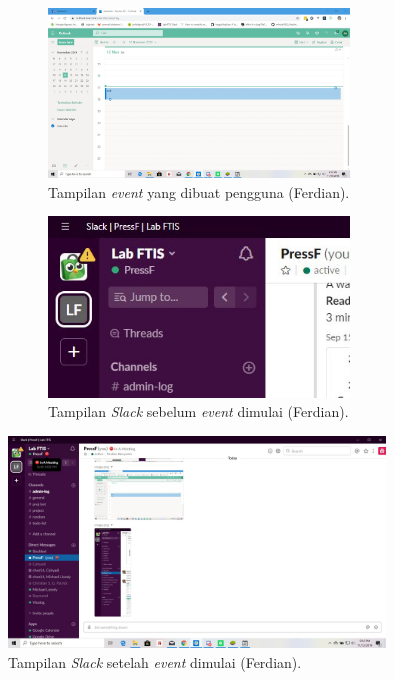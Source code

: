 \begin{figure}[h]
\begin{subfigure}{8.5cm}
  \centering
  \includegraphics[width=8cm]{./Gambar/PengujianFerdian/Outlook.jpg}
  \caption{Tampilan \textit{event} yang dibuat pengguna (Ferdian).}
  \label{fig:outlook_ferdian}
\end{subfigure}
\begin{subfigure}{8.5cm}
  \centering
  \includegraphics[width=8cm]{./Gambar/PengujianFerdian/Slack_Before(2).jpg}
  \caption{Tampilan \textit{Slack} sebelum \textit{event} dimulai (Ferdian).}
  \label{fig:slack_before_ferdian}
\end{subfigure}
\caption{}
\end{figure}

\begin{figure}[h]
  \includegraphics[width=10cm]{./Gambar/PengujianFerdian/Slack_After.jpg}
  \centering
  \caption{Tampilan \textit{Slack} setelah \textit{event} dimulai (Ferdian).}
  \label{fig:slack_after_ferdian}
\end{figure}

